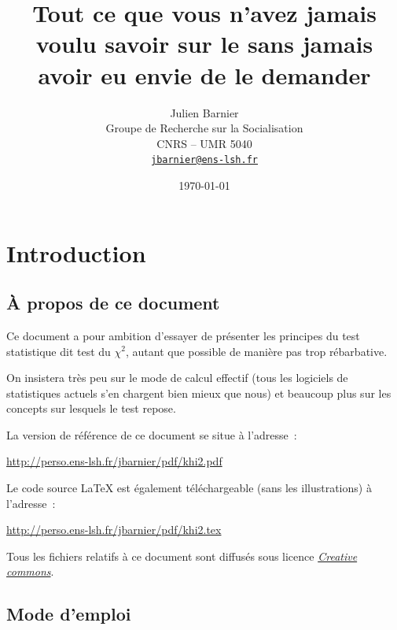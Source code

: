 \documentclass[a4paper,10pt,twoside,francais]{report}
\title{Tout ce que vous n'avez jamais voulu savoir sur le \chid sans
  jamais avoir eu envie de le demander}
\author{Julien Barnier\\ Groupe de Recherche sur la Socialisation\\
  CNRS -- UMR 5040\\ \href{mailto:jbarnier@ens-lsh.fr}{\texttt{jbarnier@ens-lsh.fr}}}
\date{\today{}}
\newcommand{\chid}{$\chi^2$\xspace}
\begin{document}
\renewcommand\chaptername{Partie}

\maketitle
\thispagestyle{empty}

\pagestyle{fancy} 
\renewcommand{\chaptermark}[1]{\markboth{#1}{}}
\renewcommand{\sectionmark}[1]{\markright{\thesection.\ #1}}
\fancyhead{}
\fancyhead[RO,LE]{\thepage}
\fancyhead[RE]{\nouppercase{\leftmark}}
\fancyhead[LO]{\nouppercase{\rightmark}}
\fancyfoot{}

\tableofcontents


\sloppy

\setlength{\parskip}{1.5ex}


\chapter{Introduction}

\section{À propos de ce document}

Ce document a pour ambition d'essayer de présenter les principes du
test statistique dit \og test du \chid \fg{}, autant que possible de
manière pas trop rébarbative.

On insistera très peu sur le mode de calcul effectif (tous les
logiciels de statistiques actuels s'en chargent bien mieux que nous)
et beaucoup plus sur les concepts sur lesquels le test repose.

La version de référence de ce document se situe à l'adresse~:

\url{http://perso.ens-lsh.fr/jbarnier/pdf/khi2.pdf}

Le code source \LaTeX{} est également téléchargeable (sans les
illustrations) à l'adresse~:

\url{http://perso.ens-lsh.fr/jbarnier/pdf/khi2.tex}

Tous les fichiers relatifs à ce document sont diffusés sous licence
\href{http://creativecommons.org/licenses/by/2.0/fr/}{\textit{Creative commons}}.

\section{Mode d'emploi}
\end{document}
